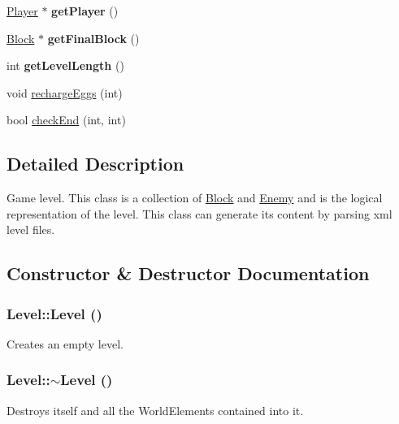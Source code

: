 \begin{DoxyCompactItemize}
\item 
\hypertarget{classLevel_a98b9579253fbf55f7d631853c4cd7e9c}{
\hyperlink{classPlayer}{Player} $\ast$ {\bfseries getPlayer} ()}
\label{classLevel_a98b9579253fbf55f7d631853c4cd7e9c}

\item 
\hypertarget{classLevel_a7673f92a80336360694763a3511aba02}{
\hyperlink{classBlock}{Block} $\ast$ {\bfseries getFinalBlock} ()}
\label{classLevel_a7673f92a80336360694763a3511aba02}

\item 
\hypertarget{classLevel_af83cb8979a8c8a27a55c89cf398f06cf}{
int {\bfseries getLevelLength} ()}
\label{classLevel_af83cb8979a8c8a27a55c89cf398f06cf}

\item 
void \hyperlink{classLevel_af0aa91cdb9e52145003e7fcf8ed9ac25}{rechargeEggs} (int)
\item 
bool \hyperlink{classLevel_a02d8597c96961e7d27932fc686a5b94b}{checkEnd} (int, int)
\end{DoxyCompactItemize}


\subsection{Detailed Description}
Game level. This class is a collection of \hyperlink{classBlock}{Block} and \hyperlink{classEnemy}{Enemy} and is the logical representation of the level. This class can generate its content by parsing xml level files. 

\subsection{Constructor \& Destructor Documentation}
\hypertarget{classLevel_a7a696c928ca5d5354db6e50e46d0f67d}{
\subsubsection[{Level}]{\setlength{\rightskip}{0pt plus 5cm}Level::Level ()}}
\label{classLevel_a7a696c928ca5d5354db6e50e46d0f67d}
Creates an empty level. \hypertarget{classLevel_a249eac1e8f19ff44134efa5e986feaca}{
\subsubsection[{$\sim$Level}]{\setlength{\rightskip}{0pt plus 5cm}Level::$\sim$Level ()}}
\label{classLevel_a249eac1e8f19ff44134efa5e986feaca}
Destroys itself and all the WorldElements contained into it. 

